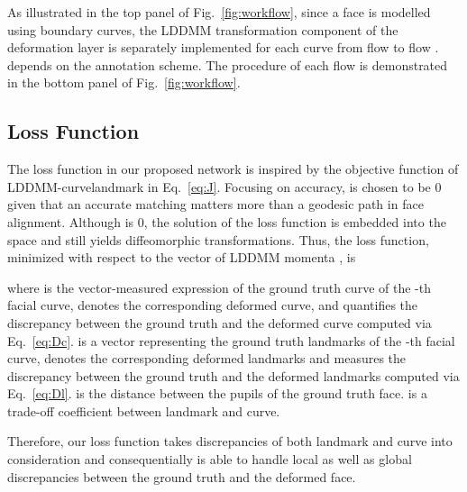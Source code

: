 \documentclass[10pt,twocolumn,letterpaper]{article}
\begin{document}
As illustrated in the top panel of Fig.~\ref{fig:workflow}, since a face is modelled using  boundary curves, the LDDMM transformation component of the deformation layer is separately implemented for each curve from flow  to flow .  depends on the annotation scheme. The procedure of each flow is demonstrated in the bottom panel of Fig.~\ref{fig:workflow}.

\subsection{Loss Function}\label{loss function}

The loss function in our proposed network is inspired by the objective function of LDDMM-curvelandmark in Eq.~\ref{eq:J}. Focusing on accuracy,  is chosen to be 0 given that an accurate matching matters more than a geodesic path in face alignment. Although  is 0, the solution of the loss function is embedded into the  space and still yields diffeomorphic transformations. Thus, the loss function, minimized with respect to the vector of LDDMM momenta , is

\begin{small} 

\end{small}where  is the vector-measured expression of the ground truth curve of the -th facial curve,  denotes the corresponding deformed curve, and  quantifies the discrepancy between the ground truth and the deformed curve computed via Eq.~\ref{eq:Dc}.  is a vector representing the ground truth landmarks of the -th facial curve,  denotes the corresponding deformed landmarks and  measures the discrepancy between the ground truth and the deformed landmarks computed via Eq.~\ref{eq:Dl}.   is the distance between the pupils of the ground truth face.  is a trade-off coefficient between landmark and curve.

Therefore, our loss function takes discrepancies of both landmark and curve into consideration and consequentially is able to handle local as well as global discrepancies between the ground truth and the deformed face.
\end{document}
